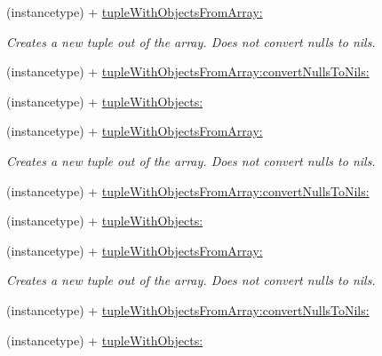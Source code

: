 \begin{DoxyCompactItemize}
\item 
\mbox{\label{interface_r_a_c_tuple_a3a1907a961d70cac573b0a4daea43834}} 
(instancetype) + \mbox{\hyperlink{interface_r_a_c_tuple_a3a1907a961d70cac573b0a4daea43834}{tuple\+With\+Objects\+From\+Array\+:}}
\begin{DoxyCompactList}\small\item\em Creates a new tuple out of the array. Does not convert nulls to nils. \end{DoxyCompactList}\item 
(instancetype) + \mbox{\hyperlink{interface_r_a_c_tuple_afe0710811403bf06fd2eda9062433109}{tuple\+With\+Objects\+From\+Array\+:convert\+Nulls\+To\+Nils\+:}}
\item 
(instancetype) + \mbox{\hyperlink{interface_r_a_c_tuple_aee3e51cf62b2f6f2c12607117a01f5ae}{tuple\+With\+Objects\+:}}
\item 
\mbox{\label{interface_r_a_c_tuple_a3a1907a961d70cac573b0a4daea43834}} 
(instancetype) + \mbox{\hyperlink{interface_r_a_c_tuple_a3a1907a961d70cac573b0a4daea43834}{tuple\+With\+Objects\+From\+Array\+:}}
\begin{DoxyCompactList}\small\item\em Creates a new tuple out of the array. Does not convert nulls to nils. \end{DoxyCompactList}\item 
(instancetype) + \mbox{\hyperlink{interface_r_a_c_tuple_afe0710811403bf06fd2eda9062433109}{tuple\+With\+Objects\+From\+Array\+:convert\+Nulls\+To\+Nils\+:}}
\item 
(instancetype) + \mbox{\hyperlink{interface_r_a_c_tuple_aee3e51cf62b2f6f2c12607117a01f5ae}{tuple\+With\+Objects\+:}}
\item 
\mbox{\label{interface_r_a_c_tuple_a3a1907a961d70cac573b0a4daea43834}} 
(instancetype) + \mbox{\hyperlink{interface_r_a_c_tuple_a3a1907a961d70cac573b0a4daea43834}{tuple\+With\+Objects\+From\+Array\+:}}
\begin{DoxyCompactList}\small\item\em Creates a new tuple out of the array. Does not convert nulls to nils. \end{DoxyCompactList}\item 
(instancetype) + \mbox{\hyperlink{interface_r_a_c_tuple_afe0710811403bf06fd2eda9062433109}{tuple\+With\+Objects\+From\+Array\+:convert\+Nulls\+To\+Nils\+:}}
\item 
(instancetype) + \mbox{\hyperlink{interface_r_a_c_tuple_aee3e51cf62b2f6f2c12607117a01f5ae}{tuple\+With\+Objects\+:}}
\end{DoxyCompactItemize}
